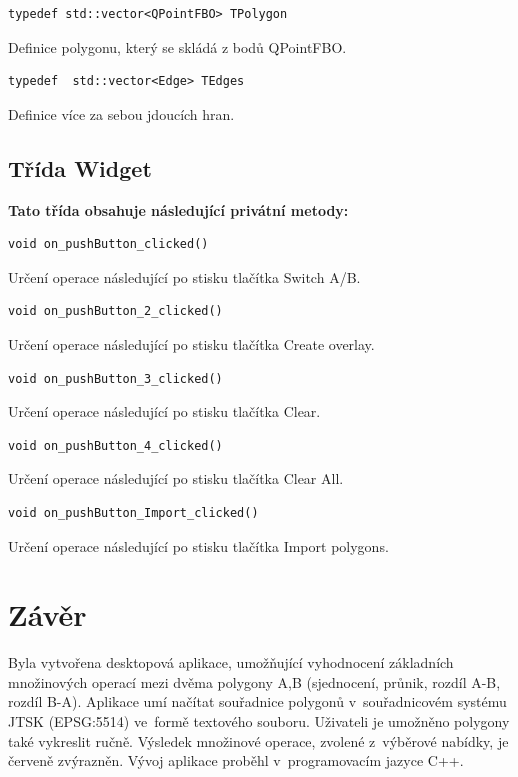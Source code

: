 \documentclass[a4paper, 12pt, oneside, titlepage]{article} %
\begin{document}
\begin{verbatim}
typedef std::vector<QPointFBO> TPolygon
\end{verbatim}
Definice polygonu, který se skládá z bodů QPointFBO.

\begin{verbatim}
typedef  std::vector<Edge> TEdges
\end{verbatim}
Definice více za sebou jdoucích hran.

\subsection{Třída Widget}
\textbf{Tato třída obsahuje následující privátní metody:}

\begin{verbatim}
void on_pushButton_clicked()
\end{verbatim}
Určení operace následující po stisku tlačítka Switch A/B.

\begin{verbatim}
void on_pushButton_2_clicked()
\end{verbatim}
Určení operace následující po stisku tlačítka Create overlay.

\begin{verbatim}
void on_pushButton_3_clicked()
\end{verbatim}
Určení operace následující po stisku tlačítka Clear.

\begin{verbatim}
void on_pushButton_4_clicked()
\end{verbatim}
Určení operace následující po stisku tlačítka Clear All.

\begin{verbatim}
void on_pushButton_Import_clicked()
\end{verbatim}
Určení operace následující po stisku tlačítka Import polygons.


\section{Závěr}
Byla vytvořena desktopová aplikace, umožňující vyhodnocení základních množinových operací mezi dvěma polygony A,B (sjednocení, průnik, rozdíl A-B, rozdíl B-A). Aplikace umí načítat souřadnice polygonů v~souřadnicovém systému JTSK (EPSG:5514) ve~formě textového souboru. Uživateli je umožněno polygony také vykreslit ručně. Výsledek množinové operace, zvolené z~výběrové nabídky, je červeně zvýrazněn. Vývoj aplikace proběhl v~programovacím jazyce C++. 
\end{document}
